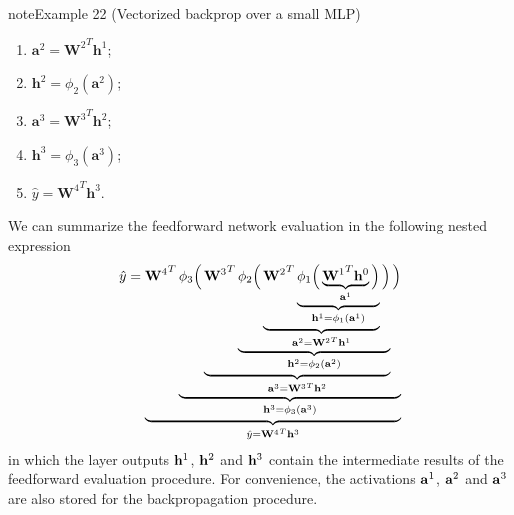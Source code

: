 \documentclass[letterpaper,10pt,english]{jupyterBook}
\begin{document}
\begin{sphinxadmonition}{note}{Example 22 (Vectorized backprop over a small MLP)}
\begin{enumerate}
\item {} 
\sphinxAtStartPar
\( \mathbf{a}^2 = {\mathbf{W}^2}^{T} \mathbf{h}^1 \);

\item {} 
\sphinxAtStartPar
\( \mathbf{h}^2 = \phi_2(\mathbf{a}^2) \);

\item {} 
\sphinxAtStartPar
\( \mathbf{a}^3 = {\mathbf{W}^3}^{T} \mathbf{h}^2 \);

\item {} 
\sphinxAtStartPar
\( \mathbf{h}^3 = \phi_3(\mathbf{a}^3) \);

\item {} 
\sphinxAtStartPar
\( \hat{y}={\mathbf{W}^4}^{T} \mathbf{h}^3 \).

\end{enumerate}

\sphinxAtStartPar
We can summarize the feedforward network evaluation in the following nested expression
\begin{equation*}
\begin{split}
\hat{y} = \underbrace{{\mathbf{W}^{4}}^{T} 
\underbrace{\phi_3 \Big(
\underbrace{{\mathbf{W}^{3}}^{T}
\underbrace{\phi_2 \Big(
\underbrace{{\mathbf{W}^{2}}^{T} 
\underbrace{\phi_1 \Big(
\underbrace{{\mathbf{W}^{1}}^{T} {\bf h}^0}_{\mathbf{a}^1}
\Big)}_{\mathbf{h}^1=\phi_1(\mathbf{a}^1)}}_{\mathbf{a}^2= {\mathbf{W}^2}^{T} \mathbf{h}^1}
\Big)}_{\mathbf{h}^2=\phi_2(\mathbf{a}^2)}}_{\mathbf{a}^3={\mathbf{W}^3}^{T} \mathbf{h}^2}
\Big)}_{\mathbf{h}^3=\phi_3(\mathbf{a}^3)}}_{\hat{y}={\mathbf{W}^4}^{T} \mathbf{h}^3}
\end{split}
\end{equation*}
in which the layer outputs \( {\bf h}^{1} \), \( {\bf h}^{2} \) and \( {\bf h}^{3} \) contain the intermediate results of the feedforward evaluation procedure. For convenience, the activations \( {\bf a}^{1} \), \( {\bf a}^{2} \) and \( {\bf a}^{3} \) are also stored for the backpropagation procedure.


\end{sphinxadmonition}
\end{document}
